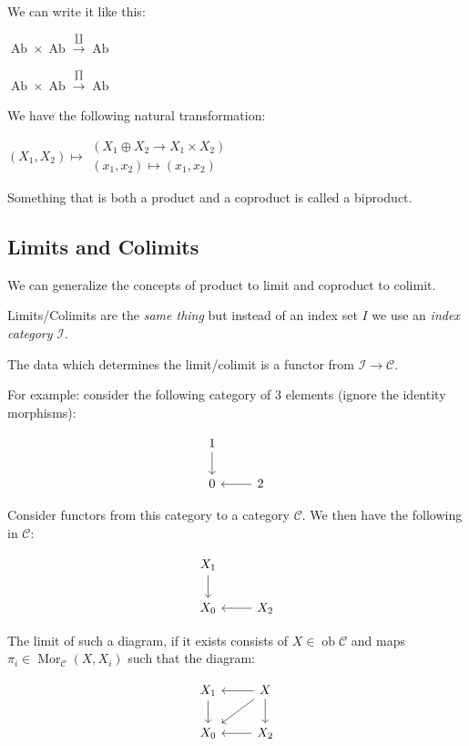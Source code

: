 \documentclass{article}
\theoremstyle{definition}
\begin{document}
    We can write it like this:

    \(\operatorname{Ab} \times \operatorname{Ab} \xrightarrow{\coprod} \operatorname{Ab}\) 

    \(\operatorname{Ab} \times \operatorname{Ab} \xrightarrow{\prod} \operatorname{Ab}\)

    We have the following natural transformation:

    \((X_1, X_2) \mapsto \begin{matrix} (X_1 \oplus X_2 \to X_1 \times X_2) \\ (x_1, x_2) \mapsto (x_1, x_2) \end{matrix}\) 

    Something that is both a product and a coproduct is called a biproduct.

    \subsection*{Limits and Colimits}

    We can generalize the concepts of product to limit and coproduct to colimit.

    Limits/Colimits are the \textit{same thing} but instead of an index set \(I\) we use an \textit{index category} \(\mathcal{I}\).

    The data which determines the limit/colimit is a functor from \(\mathcal{I} \to \mathcal{C}\).

    For example: consider the following category of \(3\) elements (ignore the identity morphisms):

    \[
        \begin{tikzcd}
            1 \ar[d] \\ 0 & 2 \ar[l]
        \end{tikzcd}
    \]

    Consider functors from this category to a category \(\mathcal{C}\). We then have the following in \(\mathcal{C}\):

    \[
        \begin{tikzcd}
            X_1 \ar[d] \\ X_0 & X_2\ar[l]
        \end{tikzcd}
    \]

    The limit of such a diagram, if it exists consists of \(X\in \operatorname{ob} \mathcal{C}\) and maps \(\pi_i \in \operatorname{Mor}_{\mathcal{C}}(X,X_i)\) such that the diagram:

    \[
        \begin{tikzcd}
            X_1 \ar[d] & X \ar[l] \ar[ld] \ar[d] \\ X_0 & X_2\ar[l]
        \end{tikzcd}
    \]
\end{document}
